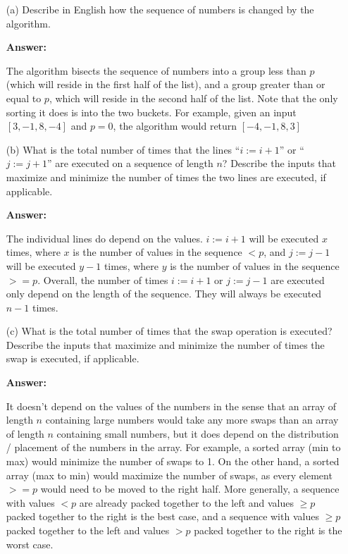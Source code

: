 \documentclass[14pt]{extreport}
\newcommand{\answer}[0]{\medskip \textbf{Answer:} \medskip}
\begin{document}
\begin{enumerate}
    
    \item[(a)] Describe in English how the sequence of numbers is changed by the algorithm.
    
        \answer

        The algorithm bisects the sequence of numbers into a group less than \( p \) (which will reside in the first half of the list), and a group greater than or equal to \( p \), which will reside in the second half of the list. Note that the only sorting it does is into the two buckets. For example, given an input \( [3, -1, 8, -4] \) and \( p = 0 \), the algorithm would return \( [-4, -1, 8, 3] \)

    \item[(b)] What is the total number of times that the lines ``\( i := i + 1 \)'' or ``\( j := j + 1 \)'' are executed on a sequence of length \( n \)? Describe the inputs that maximize and minimize the number of times the two lines are executed, if applicable.
    
        \answer

        The individual lines do depend on the values. \( i := i + 1 \) will be executed \( x \) times, where \( x \) is the number of values in the sequence \( < p \), and \( j := j - 1 \) will be executed \( y - 1 \) times, where \( y \) is the number of values in the sequence \( >= p \). Overall, the number of times \( i := i + 1 \) or \( j := j - 1 \) are executed only depend on the length of the sequence. They will always be executed \( n - 1 \) times.

    \item[(c)] What is the total number of times that the swap operation is executed? Describe the inputs that maximize and minimize the number of times the swap is executed, if applicable.

        \answer

        It doesn't depend on the values of the numbers in the sense that an array of length \( n \) containing large numbers would take any more swaps than an array of length \( n \) containing small numbers, but it does depend on the distribution / placement of the numbers in the array. For example, a sorted array (min to max) would minimize the number of swaps to 1. On the other hand, a sorted array (max to min) would maximize the number of swaps, as every element \( >= p \) would need to be moved to the right half. More generally, a sequence with values \( < p \) are already packed together to the left and values \( \geq p \) packed together to the right is the best case, and a sequence with values \( \geq p \) packed together to the left and values \( > p \) packed together to the right is the worst case.


\end{enumerate}
\end{document}
